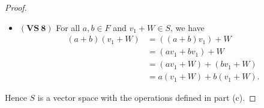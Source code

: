 \begin{Exercise}
\begin{enumerate}[(a)]
\begin{proof}
\begin{itemize}
				\item $\mathbf{(VS\ 8)}$
				For all $a,b\in F$ and $v_1+W\in S$, we have
				\begin{align*}
					(a+b)(v_1+W)
					&= ((a+b)v_1) + W \\
					&= (a v_1 + b v_1) + W \\
					&= (a v_1 + W) + (b v_1 + W) \\
					&= a(v_1+W) + b(v_1+W).
				\end{align*}
			\end{itemize}
			Hence $S$ is a vector space with the operations defined in part (c).
		\end{proof}
	\end{enumerate}
\end{Exercise}